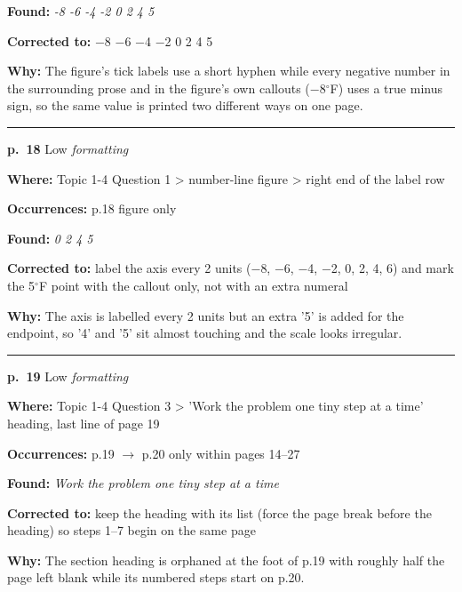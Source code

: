 \documentclass[11pt]{article}
\newcommand{\sevlow}[1]{\textcolor{black!55}{#1}}
\begin{document}
\noindent\textbf{Found: }\textit{-8 -6 -4 -2 0 2 4 5}\par
\noindent\textbf{Corrected to: }$-$8 $-$6 $-$4 $-$2 0 2 4 5\par
\noindent\textbf{Why: }The figure's tick labels use a short hyphen while every negative number in the surrounding prose and in the figure's own callouts ($-$8$^\circ$F) uses a true minus sign, so the same value is printed two different ways on one page.\par\vspace{4pt}
\noindent\rule{\textwidth}{0.4pt}\par\nobreak\vspace{2pt}
\noindent\textbf{p.~18} \quad \sevlow{Low} \quad \textit{formatting}\par
\noindent\textbf{Where: }Topic 1-4 Question 1 > number-line figure > right end of the label row\par
\noindent\textbf{Occurrences: }p.18 figure only\par
\noindent\textbf{Found: }\textit{0 2 4 5}\par
\noindent\textbf{Corrected to: }label the axis every 2 units ($-$8, $-$6, $-$4, $-$2, 0, 2, 4, 6) and mark the 5$^\circ$F point with the callout only, not with an extra numeral\par
\noindent\textbf{Why: }The axis is labelled every 2 units but an extra '5' is added for the endpoint, so '4' and '5' sit almost touching and the scale looks irregular.\par\vspace{4pt}
\noindent\rule{\textwidth}{0.4pt}\par\nobreak\vspace{2pt}
\noindent\textbf{p.~19} \quad \sevlow{Low} \quad \textit{formatting}\par
\noindent\textbf{Where: }Topic 1-4 Question 3 > 'Work the problem one tiny step at a time' heading, last line of page 19\par
\noindent\textbf{Occurrences: }p.19 $\to$ p.20 only within pages 14--27\par
\noindent\textbf{Found: }\textit{Work the problem one tiny step at a time}\par
\noindent\textbf{Corrected to: }keep the heading with its list (force the page break before the heading) so steps 1--7 begin on the same page\par
\noindent\textbf{Why: }The section heading is orphaned at the foot of p.19 with roughly half the page left blank while its numbered steps start on p.20.\par\vspace{4pt}
\end{document}
